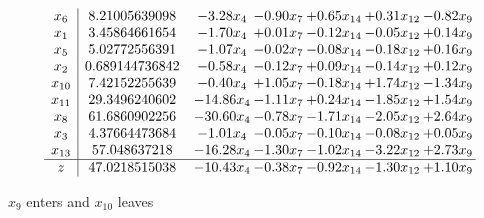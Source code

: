 \documentclass[9pt]{article}
\begin{document}
 \[\begin{array}{c| c c@{\hskip 2pt} c@{\hskip 2pt} c@{\hskip 2pt} c@{\hskip 2pt} c@{\hskip 2pt} }
 x_{6}   &  8.21005639098 & -3.28 x_{4} & -0.90 x_{7} & +  0.65 x_{14} & +  0.31 x_{12} & -0.82 x_{9}\\
 x_{1}   &  3.45864661654 & -1.70 x_{4} & +  0.01 x_{7} & -0.12 x_{14} & -0.05 x_{12} & +  0.14 x_{9}\\
 x_{5}   &  5.02772556391 & -1.07 x_{4} & -0.02 x_{7} & -0.08 x_{14} & -0.18 x_{12} & +  0.16 x_{9}\\
 x_{2}   &  0.689144736842 & -0.58 x_{4} & -0.12 x_{7} & +  0.09 x_{14} & -0.14 x_{12} & +  0.12 x_{9}\\
 x_{10}   &  7.42152255639 & -0.40 x_{4} & +  1.05 x_{7} & -0.18 x_{14} & +  1.74 x_{12} & -1.34 x_{9}\\
 x_{11}   &  29.3496240602 & -14.86 x_{4} & -1.11 x_{7} & +  0.24 x_{14} & -1.85 x_{12} & +  1.54 x_{9}\\
 x_{8}   &  61.6860902256 & -30.60 x_{4} & -0.78 x_{7} & -1.71 x_{14} & -2.05 x_{12} & +  2.64 x_{9}\\
 x_{3}   &  4.37664473684 & -1.01 x_{4} & -0.05 x_{7} & -0.10 x_{14} & -0.08 x_{12} & +  0.05 x_{9}\\
 x_{13}   &  57.048637218 & -16.28 x_{4} & -1.30 x_{7} & -1.02 x_{14} & -3.22 x_{12} & +  2.73 x_{9}\\
\hline
z    &  47.0218515038 & -10.43 x_{4} & -0.38 x_{7} & -0.92 x_{14} & -1.30 x_{12} & +  1.10 x_{9}\\
\end{array}\]


 $ x_{9} $ enters and $ x_{10} $ leaves 
\end{document}
